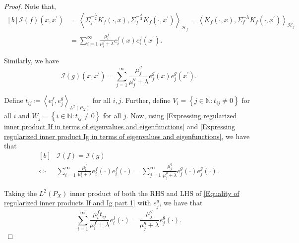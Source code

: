\documentclass[11pt]{article}
\newcommand{\Hf}{\mathcal{H}_{f}}
\newcommand{\inprod}[1]{\left \langle #1 \right\rangle}
\newcommand{\LPtwo}{L^{2}(P_{X})}
\theoremstyle{plain}
\begin{document}
\begin{proof}
    Note that,
    \begin{equation}\label{Expressing regularized inner product If in terms of eigenvalues and eigenfunctions}
    \begin{aligned}[b]
    \mathcal{I}(f)(x,x^{\prime}) &= \inprod{\Sigma_{f}^{-\frac{\lambda}{2}}K_{f}(\cdot,x),\Sigma_{f}^{-\frac{\lambda}{2}}K_{f}(\cdot,x^{\prime})}_{\Hf} 
     = \inprod{K_{f}(\cdot,x),\Sigma_{f}^{-\lambda}K_{f}(\cdot,x^{\prime})}_{\Hf}\\
    & = \sum_{i=1}^{\infty} \frac{\mu_{i}^{f}}{\mu_{i}^{f} + \lambda} e_{i}^{f}(x) e_{i}^{f}(x^{\prime}). 
    \end{aligned}
    \end{equation}

    Similarly, we have
    \begin{equation}\label{Expressing regularized inner product Ig in terms of eigenvalues and eigenfunctions}
    \mathcal{I}(g)(x,x^{\prime}) = \sum_{j=1}^{\infty} \frac{\mu_{j}^{g}}{\mu_{j}^{g} + \lambda} e_{j}^{g}(x) e_{j}^{g}(x^{\prime}). 
    \end{equation}

    Define $t_{ij} \coloneq \inprod{e_{i}^{f},e_{j}^{g}}_{\LPtwo}$ for all $i,j$. Further, define $V_{i} = \left\{j \in \mathbb{N} : t_{ij} \neq 0\right\}$ for all $i$ and $W_{j} = \left\{i \in \mathbb{N} : t_{ij} \neq 0\right\}$ for all $j$. Now, using \eqref{Expressing regularized inner product If in terms of eigenvalues and eigenfunctions} and \eqref{Expressing regularized inner product Ig in terms of eigenvalues and eigenfunctions}, we have that
    \begin{equation}\label{Equality of regularized inner products If and Ig part 1}
        \begin{aligned}[b]
            &\mathcal{I}(f) = \mathcal{I}(g)\\
            \iff &\sum_{i=1}^{\infty} \frac{\mu_{i}^{f}}{\mu_{i}^{f} + \lambda} e_{i}^{f}(\cdot) e_{i}^{f}(\cdot) = \sum_{j=1}^{\infty} \frac{\mu_{j}^{g}}{\mu_{j}^{g} + \lambda} e_{j}^{g}(\cdot) e_{j}^{g}(\cdot) .
        \end{aligned}
    \end{equation}

    Taking the $\LPtwo$ inner product of both the RHS and LHS of \eqref{Equality of regularized inner products If and Ig part 1} with $e_{j}^{g}$, we have that
    \begin{equation}\label{Equality of regularized inner products If and Ig part 2}
        \sum_{i=1}^{\infty} \frac{\mu_{i}^{f}t_{ij}}{\mu_{i}^{f} + \lambda} e_{i}^{f}(\cdot) = \frac{\mu_{j}^{g}}{\mu_{j}^{g} + \lambda} e_{j}^{g}(\cdot) .
    \end{equation}


\end{proof}
\end{document}
